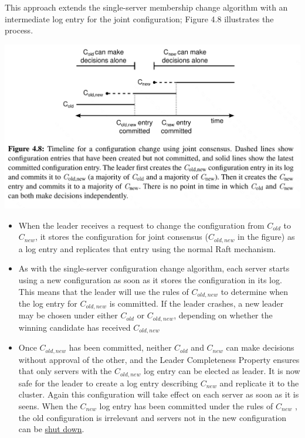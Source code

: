 \documentclass[11pt]{article}
\begin{document}
This approach extends the single-server membership change algorithm with an intermediate log entry for
the joint configuration; Figure 4.8 illustrates the process.
\begin{center}
\includegraphics[width=.99\textwidth]{../../images/papers/26.png}
\label{}
\end{center}
\begin{itemize}
\item When the leader receives a request to change the configuration from \(C_{old}\) to \(C_{new}\), it
stores the configuration for joint consensus (\(C_{old,new}\) in the figure) as a log entry and
replicates that entry using the normal Raft mechanism.
\item As with the single-server configuration change algorithm, each server starts using a new
configuration as soon as it stores the configuration in its log. This means that the leader will use
the rules of \(C_{old,new}\) to determine when the log entry for \(C_{old,new}\) is committed. If
the leader crashes, a new leader may be chosen under either \(C_{old}\) or \(C_{old,new}\),
depending on whether the winning candidate has received \(C_{old,new}\)
\item Once \(C_{old,new}\) has been committed, neither \(C_{old}\) and \(C_{new}\) can make decisions
without approval of the other, and the Leader Completeness Property ensures that only servers with
the \(C_{old,new}\) log entry can be elected as leader. It is now safe for the leader to create a
log entry describing \(C_{new}\) and replicate it to the cluster. Again this configuration will take
effect on each server as soon as it is seens. When the \(C_{new}\) log entry has been committed
under the rules of \(C_{new}\) , the old configuration is irrelevant and servers not in the new
configuration can be \uline{shut down}.
\end{itemize}
\end{document}
